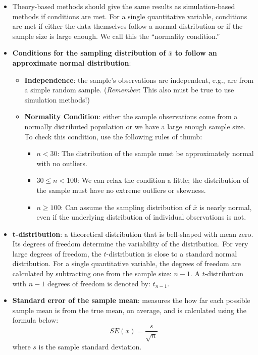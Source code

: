 \documentclass[
]{report}
\begin{document}
\begin{itemize}
\item
  Theory-based methods should give the same results as simulation-based methods if conditions are met. For a single quantitative variable, conditions are met if either the data themselves follow a normal distribution or if the sample size is large enough. We call this the ``normality condition.''
\item
  \textbf{Conditions for the sampling distribution of \(\bar{x}\) to follow an approximate normal distribution}:

  \begin{itemize}
  \item
    \textbf{Independence}: the sample's observations are independent, e.g., are from a simple random sample. (\emph{Remember}: This also must be true to use simulation methods!)
  \item
    \textbf{Normality Condition}: either the sample observations come from a normally distributed population or we have a large enough sample size. To check this condition, use the following rules of thumb:

    \begin{itemize}
    \item
      \(n < 30\): The distribution of the sample must be approximately normal with no outliers.
    \item
      \(30 \le n < 100\): We can relax the condition a little; the distribution of the sample must have no extreme outliers or skewness.
    \item
      \(n \ge 100\): Can assume the sampling distribution of \(\bar{x}\) is nearly normal, even if the underlying distribution of individual observations is not.
    \end{itemize}
  \end{itemize}
\item
  \textbf{t-distribution}: a theoretical distribution that is bell-shaped with mean zero. Its degrees of freedom determine the variability of the distribution. For very large degrees of freedom, the \(t\)-distribution is close to a standard normal distribution. For a single quantitative variable, the degrees of freedom are calculated by subtracting one from the sample size: \(n-1\). A \(t\)-distribution with \(n-1\) degrees of freedom is denoted by: \(t_{n-1}\).
\item
  \textbf{Standard error of the sample mean}: measures the how far each possible sample mean is from the true mean, on average, and is calculated using the formula below:
  \[SE(\bar{x})=\frac{s}{\sqrt{n}}\]
  where \(s\) is the sample standard deviation.


\end{itemize}
\end{document}
